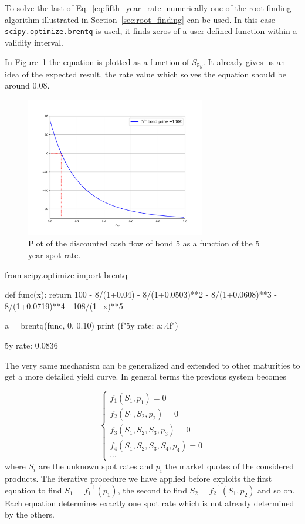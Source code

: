 To solve the last of Eq.~\ref{eq:fifth_year_rate} numerically one of the root finding algorithm illustrated in Section~\ref{sec:root_finding} can be used. 
In this case \texttt{scipy.optimize.brentq} is used, it finds zeros of a user-defined function within a validity interval.

In Figure~\ref{fig:fifth_year_rate} the equation is plotted as a function of $S_{5y}$. It already gives us an idea of the expected result, the rate value which solves the equation should be around 0.08.

\begin{figure}[htb]
  \centering
  \includegraphics[width=0.7\textwidth]{figures/bond_5_plot.png}
  \caption{Plot of the discounted cash flow of bond 5 as a function of the 5 year spot rate.}
  \label{fig:fifth_year_rate}
\end{figure}

\begin{ipython}
from scipy.optimize import brentq

def func(x):
    return 100 - 8/(1+0.04) - 8/(1+0.0503)**2 - 8/(1+0.0608)**3
               - 8/(1+0.0719)**4 - 108/(1+x)**5
               
a = brentq(func, 0, 0.10)
print (f"5y rate: {a:.4f}")
\end{ipython}
\begin{ioutput}
5y rate: 0.0836
\end{ioutput}

The very same mechanism can be generalized and extended to other maturities to get a more detailed yield curve. In general terms the previous system becomes

\begin{equation}
\begin{cases}
f_1(S_1, p_1) = 0 \\
f_2(S_1, S_2, p_2) = 0 \\
f_3(S_1, S_2, S_3, p_3) = 0 \\
f_4(S_1, S_2, S_3, S_4, p_4) = 0 \\
\cdots
\end{cases}
\end{equation}
where $S_i$ are the unknown spot rates and $p_i$ the market quotes of the considered products. The iterative procedure we have applied before exploits the first equation to find $S_1 = f_1^{-1}(p_1)$, the second to find $S_2 = f_2^{-1}(S_1, p_2)$ and so on. Each equation determines exactly one spot rate which is not already determined by the others.

